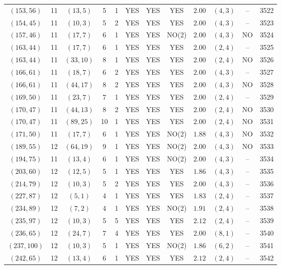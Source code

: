 \begin{longtable}{|c|c|c|c|c|c|c|c|c|c|c|c|}
$(153,56)$ & 11 & $(13,5)$ & 5 & 1 & YES & YES & YES & $2.00$ & $(4,3)$ & -- & 3522\\
$(154,45)$ & 11 & $(10,3)$ & 5 & 2 & YES & YES & YES & $2.00$ & $(4,3)$ & -- & 3523\\
$(157,46)$ & 11 & $(17,7)$ & 6 & 1 & YES & YES & NO(2) & $2.00$ & $(4,3)$ & NO & 3524\\
$(163,44)$ & 11 & $(17,7)$ & 6 & 1 & YES & YES & YES & $2.00$ & $(2,4)$ & -- & 3525\\
$(163,44)$ & 11 & $(33,10)$ & 8 & 1 & YES & YES & YES & $2.00$ & $(2,4)$ & NO & 3526\\
$(166,61)$ & 11 & $(18,7)$ & 6 & 2 & YES & YES & YES & $2.00$ & $(4,3)$ & -- & 3527\\
$(166,61)$ & 11 & $(44,17)$ & 8 & 2 & YES & YES & YES & $2.00$ & $(4,3)$ & NO & 3528\\
$(169,50)$ & 11 & $(23,7)$ & 7 & 1 & YES & YES & YES & $2.00$ & $(2,4)$ & -- & 3529\\
$(170,47)$ & 11 & $(44,13)$ & 8 & 2 & YES & YES & YES & $2.00$ & $(2,4)$ & NO & 3530\\
$(170,47)$ & 11 & $(89,25)$ & 10 & 1 & YES & YES & YES & $2.00$ & $(2,4)$ & NO & 3531\\
$(171,50)$ & 11 & $(17,7)$ & 6 & 1 & YES & YES & NO(2) & $1.88$ & $(4,3)$ & NO & 3532\\
$(189,55)$ & 12 & $(64,19)$ & 9 & 1 & YES & YES & NO(2) & $2.00$ & $(4,3)$ & NO & 3533\\
$(194,75)$ & 11 & $(13,4)$ & 6 & 1 & YES & YES & NO(2) & $2.00$ & $(4,3)$ & -- & 3534\\
$(203,60)$ & 12 & $(12,5)$ & 5 & 1 & YES & YES & YES & $1.86$ & $(4,3)$ & -- & 3535\\
$(214,79)$ & 12 & $(10,3)$ & 5 & 2 & YES & YES & YES & $2.00$ & $(4,3)$ & -- & 3536\\
$(227,87)$ & 12 & $(5,1)$ & 4 & 1 & YES & YES & YES & $1.83$ & $(2,4)$ & -- & 3537\\
$(234,89)$ & 12 & $(7,2)$ & 4 & 1 & YES & YES & NO(2) & $1.91$ & $(2,4)$ & -- & 3538\\
$(235,97)$ & 12 & $(10,3)$ & 5 & 5 & YES & YES & YES & $2.12$ & $(2,4)$ & -- & 3539\\
$(236,65)$ & 12 & $(24,7)$ & 7 & 4 & YES & YES & YES & $2.00$ & $(8,1)$ & -- & 3540\\
$(237,100)$ & 12 & $(10,3)$ & 5 & 1 & YES & YES & NO(2) & $1.86$ & $(6,2)$ & -- & 3541\\
$(242,65)$ & 12 & $(13,4)$ & 6 & 1 & YES & YES & YES & $2.12$ & $(2,4)$ & -- & 3542\\

\end{longtable}
